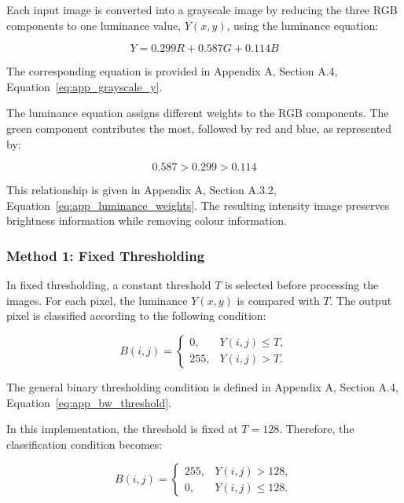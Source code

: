 Each input image is converted into a grayscale image by reducing the three RGB components to one luminance value, $Y(x,y)$, using the luminance equation:

\begin{equation}
Y=0.299R+0.587G+0.114B
\end{equation}

The corresponding equation is provided in Appendix A, Section A.4, Equation~\hyperref[eq:app_grayscale_y]{\ref*{eq:app_grayscale_y}}.

The luminance equation assigns different weights to the RGB components. The green component contributes the most, followed by red and blue, as represented by:

\begin{equation}
0.587>0.299>0.114
\end{equation}

This relationship is given in Appendix A, Section A.3.2, Equation~\hyperref[eq:app_luminance_weights]{\ref*{eq:app_luminance_weights}}. The resulting intensity image preserves brightness information while removing colour information.

\subsubsection{Method 1: Fixed Thresholding}

In fixed thresholding, a constant threshold $T$ is selected before processing the images. For each pixel, the luminance $Y(x,y)$ is compared with $T$. The output pixel is classified according to the following condition:

\begin{equation}
B(i,j)=
\begin{cases}
0, & Y(i,j)\leq T,\\
255, & Y(i,j)>T.
\end{cases}
\end{equation}

The general binary thresholding condition is defined in Appendix A, Section A.4, Equation~\hyperref[eq:app_bw_threshold]{\ref*{eq:app_bw_threshold}}.

In this implementation, the threshold is fixed at $T=128$. Therefore, the classification condition becomes:

\begin{equation}
B(i,j)=
\begin{cases}
255, & Y(i,j)>128,\\
0, & Y(i,j)\leq128.
\end{cases}
\end{equation}

